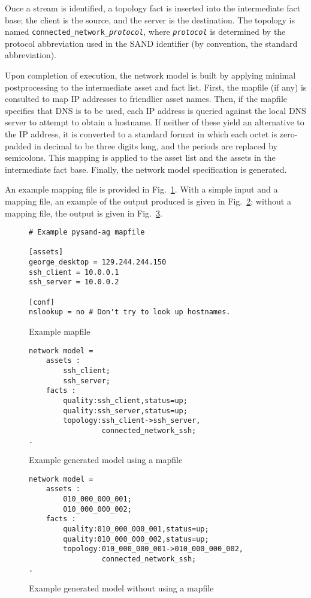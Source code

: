 \documentclass{article}
\begin{document}
Once a stream is identified, a topology fact is inserted into the
intermediate fact base; the client is the source, and the server is the
destination. The topology is named \texttt{connected\_network\_\textit{protocol}},
where \emph{\texttt{protocol}} is determined by the protocol abbreviation used
in the SAND identifier (by convention, the standard abbreviation).

Upon completion of execution, the network model is built by applying minimal
postprocessing to the intermediate asset and fact list. First, the mapfile (if
any) is consulted to map IP addresses to friendlier asset names. Then, if
the mapfile specifies that DNS is to be used, each IP address is queried
against the local DNS server to attempt to obtain a hostname. If neither of
these yield an alternative to the IP address, it is converted to a standard
format in which each octet is zero-padded in decimal to be three digits long,
and the periods are replaced by semicolons. This mapping is applied to
the asset list and the assets in the intermediate fact base. Finally, the
network model specification is generated.

An example mapping file is provided in Fig.~\ref{mapfile}. With a simple
input and a mapping file, an example of the output produced is given in
Fig.~\ref{gen_example1}; without a mapping file, the output is given in
Fig.~\ref{gen_example2}.

\begin{figure}
\begin{lstlisting}
# Example pysand-ag mapfile

[assets]
george_desktop = 129.244.244.150
ssh_client = 10.0.0.1
ssh_server = 10.0.0.2

[conf]
nslookup = no # Don't try to look up hostnames.
\end{lstlisting}
\caption{Example mapfile}
\label{mapfile}
\end{figure}

\begin{figure}
\begin{lstlisting}
network model =
    assets :
        ssh_client;
        ssh_server;
    facts :
        quality:ssh_client,status=up;
        quality:ssh_server,status=up;
        topology:ssh_client->ssh_server,
                 connected_network_ssh;
.
\end{lstlisting}
\caption{Example generated model using a mapfile}
\label{gen_example1}
\end{figure}

\begin{figure}
\begin{lstlisting}
network model =
    assets :
        010_000_000_001;
        010_000_000_002;
    facts :
        quality:010_000_000_001,status=up;
        quality:010_000_000_002,status=up;
        topology:010_000_000_001->010_000_000_002,
                 connected_network_ssh;
.
\end{lstlisting}
\caption{Example generated model without using a mapfile}
\label{gen_example2}
\end{figure}
\end{document}
